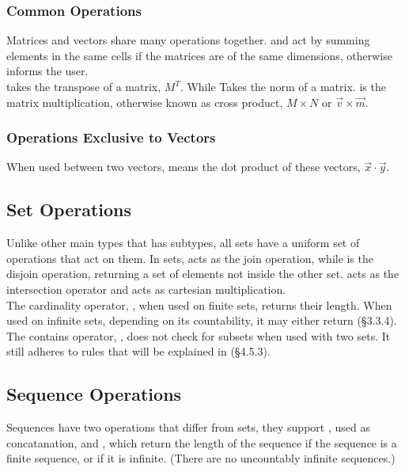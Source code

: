 \documentclass[11pt,a4paper]{book}
\begin{document}
\subsubsection{Common Operations}

Matrices and vectors share many operations together. \code{+} and \code{-} act by summing elements in the same cells if the matrices are of the same dimensions, otherwise informs the user. \\

\code{\textbackslash} takes the transpose of a matrix, $M^T$. While \code{||} Takes the norm of a matrix. \code{\&} is the matrix multiplication, otherwise known as cross product, $M \times N$ or $\vec{v} \times \vec{m}$.

\subsubsection{Operations Exclusive to Vectors}

When used between two vectors, \code{*} means the dot product of these vectors, $\vec{x} \cdot \vec{y}$.

\subsection{Set Operations}

Unlike other main types that has subtypes, all sets have a uniform set of operations that act on them. In sets, \code{+} acts as the join operation, while \code{-} is the disjoin operation, returning a set of elements not inside the other set. \code{\&} acts as the intersection operator and \code{*} acts as cartesian multiplication. \\

The cardinality operator, \code{||}, when used on finite sets, returns their length. When used on infinite sets, depending on its countability, it may either return   (\S 3.3.4). \\

The contains operator, , does not check for subsets when used with two sets. It still adheres to rules that will be explained in (\S4.5.3).

\subsection{Sequence Operations}

Sequences have two operations that differ from sets, they support \code{+}, used as concatanation, and \code{||}, which return the length of the sequence if the sequence is a finite sequence, or  if it is infinite. (There are no uncountably infinite sequences.) \\
\end{document}
